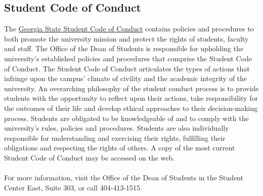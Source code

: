 \documentclass[a4paper, 12pt]{article}
\begin{document}
\subsection{Student Code of Conduct}
The \href{https://www.dropbox.com/scl/fi/6840vhdcpcssiy9ynbxex/Code-with-Cover-R-09072023.pdf?rlkey=38lfkvrq44wd8mdjj84r2ryac&dl=0}{Georgia State Student Code of Conduct} contains policies and procedures to both promote the university mission and protect the rights of students, faculty and staff. The Office of the Dean of Students is responsible for upholding the university’s established policies and procedures that comprise the Student Code of Conduct. The Student Code of Conduct articulates the types of actions that infringe upon the campus' climate of civility and the academic integrity of the university. An overarching philosophy of the student conduct process is to provide students with the opportunity to reflect upon their actions, take responsibility for the outcomes of their life and develop ethical approaches to their decision-making process. Students are obligated to be knowledgeable of and to comply with the university’s rules, policies and procedures. Students are also individually responsible for understanding and exercising their rights, fulfilling their obligations and respecting the rights of others. A copy of the most current Student Code of Conduct may be accessed on the web.\\
\\
For more information, visit the Office of the Dean of Students in the Student Center East, Suite 303, or call 404-413-1515.
\end{document}
